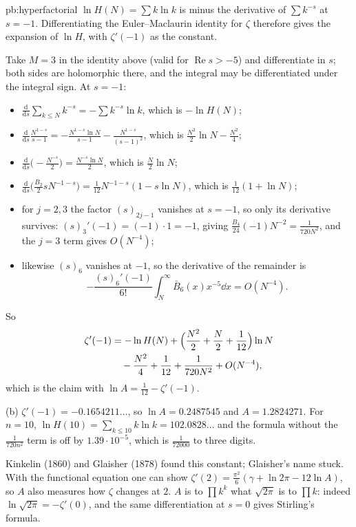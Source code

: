 \begin{solution}{pb:hyperfactorial}
\idea $\ln H(N)=\sum k\ln k$ is minus the derivative of $\sum k^{-s}$ at $s=-1$. Differentiating the Euler--Maclaurin identity for $\zeta$ therefore gives the expansion of $\ln H$, with $\zeta'(-1)$ as
the constant.

\writeup Take $M=3$ in the identity above (valid for $\operatorname{Re}s>-5$) and differentiate in $s$; both sides are holomorphic there, and the integral may be differentiated under the
integral sign. At $s=-1$:
\begin{itemize}
\item $\frac{\mathrm d}{\mathrm ds}\sum_{k\le N}k^{-s}=-\sum k^{-s}\ln k$, which is $-\ln H(N)$;
\item $\frac{\mathrm d}{\mathrm ds}\frac{N^{1-s}}{s-1}=-\frac{N^{1-s}\ln N}{s-1}-\frac{N^{1-s}}{(s-1)^2}$, which is $\frac{N^2}2\ln N-\frac{N^2}4$;
\item $\frac{\mathrm d}{\mathrm ds}\bigl(-\frac{N^{-s}}2\bigr)=\frac{N^{-s}\ln N}2$, which is $\frac N2\ln N$;
\item $\frac{\mathrm d}{\mathrm ds}\bigl(\frac{B_2}2sN^{-1-s}\bigr)=\frac1{12}N^{-1-s}(1-s\ln N)$, which is $\frac1{12}(1+\ln N)$;
\item for $j=2,3$ the factor $(s)_{2j-1}$ vanishes at $s=-1$, so only its derivative survives: $(s)_3'(-1)=(-1)\cdot1=-1$, giving $\frac{B_4}{24}(-1)N^{-2}=\frac1{720N^2}$, and the $j=3$ term gives
$O(N^{-4})$;
\item likewise $(s)_6$ vanishes at $-1$, so the derivative of the remainder is
\[
-\frac{(s)_6'(-1)}{6!}\int_N^\infty\bar B_6(x)x^{-5}\dd x=O(N^{-4}).
\]
\end{itemize}
So
\[
\begin{aligned}\zeta'(-1)&=-\ln H(N)+\Bigl(\frac{N^2}2+\frac N2+\frac1{12}\Bigr)\ln N\\&\quad-\frac{N^2}4+\frac1{12}+\frac1{720N^2}+O(N^{-4}),\end{aligned}
\]
which is the claim with $\ln A=\frac1{12}-\zeta'(-1)$.

(b) $\zeta'(-1)=-0.1654211\ldots$, so $\ln A=0.2487545$ and $A=1.2824271$. For $n=10$, $\ln H(10)=\sum_{k\le10}k\ln k=102.0828\ldots$ and the formula without the $\frac1{720n^2}$ term is off by $1.39\cdot10^{-5}$, which is $\frac1{72000}$ to
three digits.

\leads Kinkelin (1860) and Glaisher (1878) found this constant; Glaisher's name stuck. With the functional equation one can show $\zeta'(2)=\frac{\pi^2}6(\gamma+\ln2\pi-12\ln A)$, so $A$ also
measures how $\zeta$ changes at $2$. $A$ is to $\prod k^k$ what $\sqrt{2\pi}$ is to $\prod k$: indeed $\ln\sqrt{2\pi}=-\zeta'(0)$, and the same differentiation at $s=0$ gives Stirling's formula.
\end{solution}

